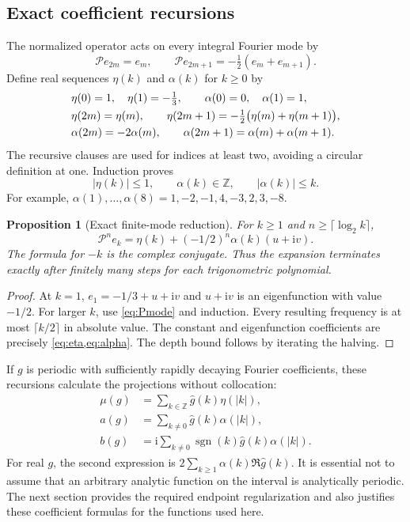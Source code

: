 \documentclass[11pt,a4paper]{article}
\newtheorem{proposition}[theorem]{Proposition}
\theoremstyle{definition}
\theoremstyle{remark}
\newcommand{\Z}{\mathbb Z}
\newcommand{\ii}{\mathrm i}
\newcommand{\Pop}{\mathcal P}
\numberwithin{equation}{section}
\begin{document}
\subsection{Exact coefficient recursions}
The normalized operator acts on every integral Fourier mode by
\begin{equation}
 \Pop e_{2m}=e_m,\qquad
 \Pop e_{2m+1}=-\tfrac12(e_m+e_{m+1}).
 \label{eq:Pmode}
\end{equation}
Define real sequences $\eta(k)$ and $\alpha(k)$ for $k\ge0$ by
\begin{align}
 &\eta(0)=1,\quad \eta(1)=-\tfrac13,\qquad
 \alpha(0)=0,\quad \alpha(1)=1,\notag\\
 &\eta(2m)=\eta(m),\qquad
   \eta(2m+1)=-\tfrac12\bigl(\eta(m)+\eta(m+1)\bigr),\label{eq:eta}\\
 &\alpha(2m)=-2\alpha(m),\qquad
   \alpha(2m+1)=\alpha(m)+\alpha(m+1).
 \label{eq:alpha}
\end{align}
The recursive clauses are used for indices at least two, avoiding a circular
definition at one. Induction proves
\begin{equation}
 |\eta(k)|\le1,\qquad \alpha(k)\in\Z,
 \qquad |\alpha(k)|\le k.
 \label{eq:sequencebounds}
\end{equation}
For example, $\alpha(1),\ldots,\alpha(8)=1,-2,-1,4,-3,2,3,-8$.

\begin{proposition}[Exact finite-mode reduction]
\label{prop:finite-mode}
For $k\ge1$ and $n\ge\lceil\log_2 k\rceil$,
\begin{equation}
 \Pop^ne_k=\eta(k)+(-1/2)^n\alpha(k)(u+\ii v).
 \label{eq:finite-mode}
\end{equation}
The formula for $-k$ is the complex conjugate. Thus the expansion terminates
exactly after finitely many steps for each trigonometric polynomial.
\end{proposition}
\begin{proof}
At $k=1$, $e_1=-1/3+u+\ii v$ and $u+\ii v$ is an eigenfunction with
value $-1/2$. For larger $k$, use \cref{eq:Pmode} and induction. Every
resulting frequency is at most $\lceil k/2\rceil$ in absolute value.
The constant and eigenfunction coefficients are precisely
\cref{eq:eta,eq:alpha}. The depth bound follows by iterating the halving.
\end{proof}

If $g$ is periodic with sufficiently rapidly decaying Fourier coefficients,
these recursions calculate the projections without collocation:
\begin{align}
 \mu(g)&=\sum_{k\in\Z}\widehat g(k)\eta(|k|),\label{eq:mufourier}\\
 a(g)&=\sum_{k\ne0}\widehat g(k)\alpha(|k|),\label{eq:afourier}\\
 b(g)&=\ii\sum_{k\ne0}\operatorname{sgn}(k)
                \widehat g(k)\alpha(|k|).
 \label{eq:bfourier}
\end{align}
For real $g$, the second expression is
$2\sum_{k\ge1}\alpha(k)\Re\widehat g(k)$. It is essential not to assume
that an arbitrary analytic function on the interval is analytically
periodic. The next section provides the required endpoint regularization
and also justifies these coefficient formulas for the functions used here.
\end{document}
